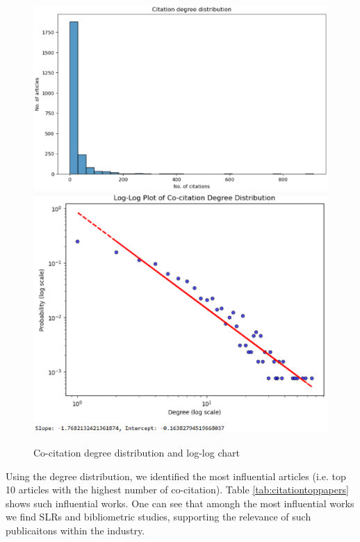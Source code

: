 \documentclass[a4paper, review, endfloat, authoryear]{elsarticle}
\begin{document}
	\begin{figure}[htbp]
		\centering
		\includegraphics[scale=0.8]{pics/citation_degree_distribution.eps}
		\includegraphics[scale=0.8]{pics/loglog_citation_degree_distribution.eps}
		\caption{Co-citation degree distribution and log-log chart} \label{fig:fig8}
	\end{figure}
	
	Using the degree distribution, we identified the most influential articles (i.e. top 10 articles with the highest number of co-citation). Table \ref{tab:citationtoppapers} shows such influential works. One can see that amongh the most influential works we find SLRs and bibliometric studies, supporting the relevance of such publicaitons within the industry.
	
\end{document}
